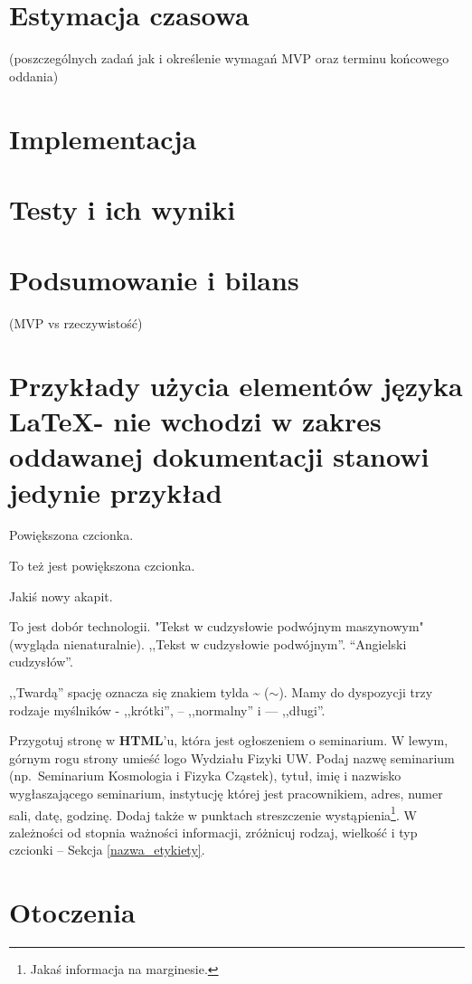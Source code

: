 \documentclass[12pt,a4paper]{article}
\begin{document}
\section{Estymacja czasowa }
(poszczególnych zadań jak i określenie wymagań MVP oraz terminu końcowego oddania)
\section{Implementacja}
\section{Testy i ich wyniki}
\section{Podsumowanie i bilans}
(MVP vs rzeczywistość)
\newpage
\section{Przykłady użycia elementów języka \LaTeX - nie wchodzi w zakres oddawanej dokumentacji stanowi jedynie przykład}
\begin{large}Powiększona czcionka.\end{large}
{\large To też jest powiększona czcionka.}

Jakiś nowy akapit.



To jest dobór technologii.
"Tekst w cudzysłowie podwójnym maszynowym" (wygląda nienaturalnie).
,,Tekst w cudzysłowie podwójnym''. ``Angielski cudzysłów''.

,,Twardą'' spację oznacza się znakiem tylda \~{} ($\sim$).
Mamy do dyspozycji trzy rodzaje myślników - ,,krótki'', -- ,,normalny'' i --- ,,długi''.

\label{nazwa_etykiety}

Przygotuj stronę w \textbf{HTML}'u, która jest ogłoszeniem o seminarium.
W lewym, górnym rogu strony umieść logo Wydziału Fizyki UW.
Podaj nazwę seminarium (np.~Seminarium Kosmologia i Fizyka Cząstek),
tytuł, imię i nazwisko  wygłaszającego seminarium,
instytucję której jest pracownikiem,
adres, numer sali, datę, godzinę.
 Dodaj także w punktach streszczenie wystąpienia\footnote{Jakaś informacja na marginesie.}.
 W zależności od stopnia ważności informacji, zróżnicuj rodzaj,
wielkość i typ czcionki -- Sekcja \ref{nazwa_etykiety}.

\section{Otoczenia}
\end{document}
